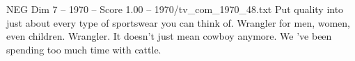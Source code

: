 \begin{textsample}{NEG Dim 7 – 1970 – Score 1.00 – 1970/tv\_com\_1970\_48.txt}  \label{ex:f7_neg_067}
Put quality into just about every type of sportswear you can think of.
Wrangler for men, women, even children.
Wrangler.
It doesn't just mean cowboy anymore.
We 've been spending too much time with cattle.

\end{textsample}
